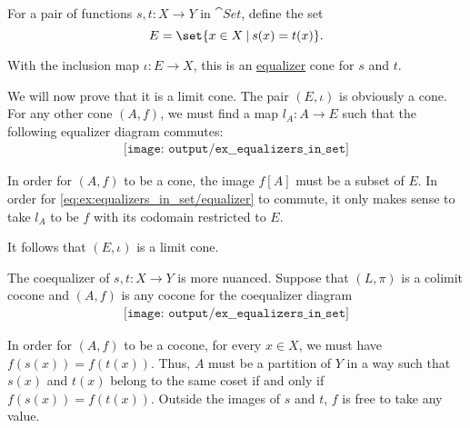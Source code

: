 \begin{example}\label{ex:equalizers_in_set}
  \hfill
  \begin{thmenum}
     For a pair of functions \( s, t: X \to Y \) in \( \cat{Set} \), define the set
    \begin{equation*}
      E = \set{ x \in X \given s(x) = t(x) }.
    \end{equation*}

    With the inclusion map \( \iota: E \to X \), this is an \hyperref[def:equalizers]{equalizer} cone for \( s \) and \( t \).

    We will now prove that it is a limit cone. The pair \( (E, \iota) \) is obviously a cone. For any other cone \( (A, f) \), we must find a map \( l_A: A \to E \) such that the following equalizer diagram commutes:
    \begin{equation}\label{eq:ex:equalizers_in_set/equalizer}
      \begin{aligned}
        \texttt{[image: output/ex\_\_equalizers\_in\_set]}
      \end{aligned}
    \end{equation}

    In order for \( (A, f) \) to be a cone, the image \( f[A] \) must be a subset of \( E \). In order for \eqref{eq:ex:equalizers_in_set/equalizer} to commute, it only makes sense to take \( l_A \) to be \( f \) with its codomain restricted to \( E \).

    It follows that \( (E, \iota) \) is a limit cone.

     The coequalizer of \( s, t: X \to Y \) is more nuanced. Suppose that \( (L, \pi) \) is a colimit cocone and \( (A, f) \) is any cocone for the coequalizer diagram
    \begin{equation}\label{eq:ex:equalizers_in_set/coequalizer}
      \begin{aligned}
        \texttt{[image: output/ex\_\_equalizers\_in\_set]}
      \end{aligned}
    \end{equation}

    In order for \( (A, f) \) to be a cocone, for every \( x \in X \), we must have \( f(s(x)) = f(t(x)) \). Thus, \( A \) must be a partition of \( Y \) in a way such that \( s(x) \) and \( t(x) \) belong to the same coset if and only if \( f(s(x)) = f(t(x)) \). Outside the images of \( s \) and \( t \), \( f \) is free to take any value.


\end{thmenum}
\end{example}
